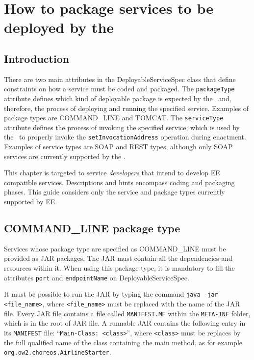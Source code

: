
\chapter{How to package services to be deployed by the \ee}

\section{Introduction}

There are two main attributes in the \textsf{DeployableServiceSpec} class that define constraints on how a service must be coded and packaged. The \texttt{packageType} attribute defines which kind of deployable package is expected by the \ee\ and, therefore, the process of deploying and running the specified service. Examples of package types are COMMAND\_LINE and TOMCAT. The \texttt{serviceType} attribute defines the process of invoking the specified service, which is used by the \ee\ to properly invoke the \texttt{setInvocationAddress} operation during enactment. Examples of service types are SOAP and REST types, although only SOAP services are currently supported by the \ee.

This chapter is targeted to service \emph{developers} that intend to develop EE compatible services.
Descriptions and hints encompass coding and packaging phases.
This guide considers only the service and package types currently supported by EE.

\section{COMMAND\_LINE package type}

Services whose package type are specified as COMMAND\_LINE must be provided as JAR packages. The JAR must contain all the dependencies and resources within it. When using this package type, it is mandatory to fill the attributes \texttt{port} and \texttt{endpointName} on \textsf{DeployableServiceSpec}.

It must be possible to run the JAR by typing the command \texttt{java -jar <file\_name>}, where \texttt{<file\_name>} must be replaced with the name of the JAR file. Every JAR file contains a file called \texttt{MANIFEST.MF} within the \texttt{META-INF} folder, which is in the root of JAR file. A runnable JAR contains the following entry in its \texttt{MANIFEST} file: ``\texttt{Main-Class: <class>}'', where \texttt{<class>} must be replaces by the full qualified name of the class containing the main method, as for example \texttt{org.ow2.choreos.AirlineStarter}.

